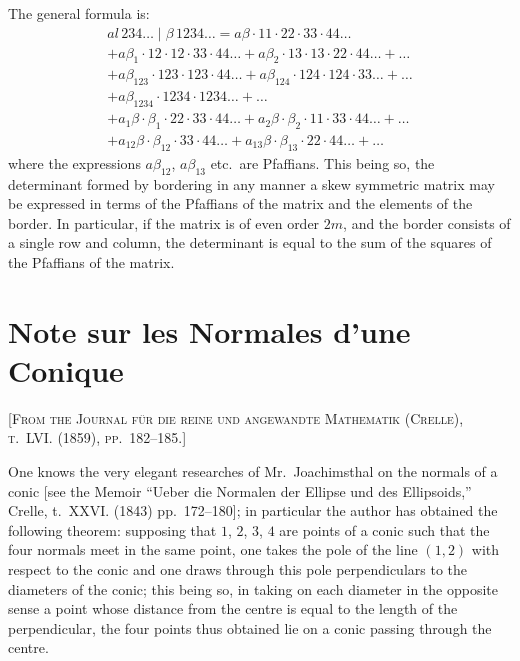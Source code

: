 \documentclass[11pt,a4paper]{book}
\begin{document}
The general formula is:
\begin{multline*}
a\!\!\textit{l}\,234\ldots \mid \beta\,1234\ldots =
a\beta \cdot 11 \cdot 22 \cdot 33 \cdot 44 \ldots \\
+ a\beta_1 \cdot 12 \cdot 12 \cdot 33 \cdot 44 \ldots
+ a\beta_2 \cdot 13 \cdot 13 \cdot 22 \cdot 44 \ldots
+ \ldots \\
+ a\beta_{123} \cdot 123 \cdot 123 \cdot 44 \ldots
+ a\beta_{124} \cdot 124 \cdot 124 \cdot 33 \ldots
+ \ldots \\
+ a\beta_{1234} \cdot 1234 \cdot 1234 \ldots
+ \ldots \\
+ a_1\beta \cdot \beta_1 \cdot 22 \cdot 33 \cdot 44 \ldots
+ a_2\beta \cdot \beta_2 \cdot 11 \cdot 33 \cdot 44 \ldots
+ \ldots \\
+ a_{12}\beta \cdot \beta_{12} \cdot 33 \cdot 44 \ldots
+ a_{13}\beta \cdot \beta_{13} \cdot 22 \cdot 44 \ldots
+ \ldots
\end{multline*}
where the expressions $a\beta_{12}$, $a\beta_{13}$ etc.\ are Pfaffians. This being so, the determinant formed by bordering in any manner a skew symmetric matrix may be expressed in terms of the Pfaffians of the matrix and the elements of the border. In particular, if the matrix is of even order $2m$, and the border consists of a single row and column, the determinant is equal to the sum of the squares of the Pfaffians of the matrix.

\newpage


\section{Note sur les Normales d'une Conique}

\textsc{[From the Journal für die reine und angewandte Mathematik (Crelle), t.~LVI. (1859), pp.~182--185.]}
\label{paper:238}

\setcounter{page}{75}

One knows the very elegant researches of Mr.~Joachimsthal on the normals of a conic [see the Memoir ``Ueber die Normalen der Ellipse und des Ellipsoids,'' Crelle, t.~XXVI. (1843) pp.~172--180]; in particular the author has obtained the following theorem: supposing that $1$, $2$, $3$, $4$ are points of a conic such that the four normals meet in the same point, one takes the pole of the line $(1,2)$ with respect to the conic and one draws through this pole perpendiculars to the diameters of the conic; this being so, in taking on each diameter in the opposite sense a point whose distance from the centre is equal to the length of the perpendicular, the four points thus obtained lie on a conic passing through the centre.
\end{document}
